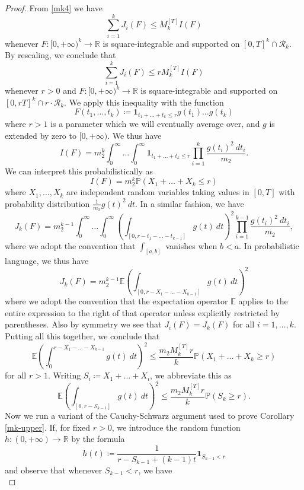 \documentclass{bmcart}
\theoremstyle{plain}
\theoremstyle{definition}
\newcommand\E{\mathbb{E}}
\newcommand\R{\mathbb{R}}
\renewcommand\P{\mathbb{P}}
\newcommand{\onef}{\mathbf{1}}
\begin{document}
\begin{proof}  From \eqref{mk4} we have
$$ \sum_{i=1}^k J_i(F) \leq M_k^{[T]} I(F)$$
whenever $F: [0,+\infty)^k \to \R$ is square-integrable and supported on $[0,T]^k \cap {\mathcal R}_k$.  By rescaling, we conclude that
$$ \sum_{i=1}^k J_i(F) \leq r M_k^{[T]} I(F)$$
whenever $r>0$ and $F: [0,+\infty)^k \to \R$ is square-integrable and supported on $[0,rT]^k \cap r \cdot {\mathcal R}_k$.  We apply this inequality with the function
$$ F(t_1,\dots,t_k) \coloneqq \onef_{t_1+\dots+t_k \leq r} g(t_1) \dots g(t_k)$$
where $r>1$ is a parameter which we will eventually average over, and $g$ is extended by zero to $[0,+\infty)$.  We thus have
$$ I(F) = m_2^k \int_0^\infty \dots \int_0^\infty \onef_{t_1+\dots+t_k \leq r} \prod_{i=1}^k \frac{g(t_i)^2\ dt_i}{m_2}.$$
We can interpret this probabilistically as
$$ I(F) = m_2^k \P( X_1 + \dots + X_k \leq r )$$
where $X_1,\dots,X_k$ are independent random variables taking values in $[0,T]$ with probability distribution $\frac{1}{m_2} g(t)^2\ dt$.  In a similar fashion, we have
$$ J_k(F) = m_2^{k-1} \int_0^\infty \dots \int_0^\infty\left (\int_{[0,r-t_1-\dots-t_{k-1}]} g(t)\ dt\right)^2 \prod_{i=1}^{k-1} \frac{g(t_i)^2\ dt_i}{m_2},$$
where we adopt the convention that $\int_{[a,b]}$ vanishes when $b<a$.  In probabilistic language, we thus have
$$ J_k(F) = m_2^{k-1} \E \left(\int_{[0,r-X_1-\dots-X_{k-1}]} g(t)\ dt\right)^2$$
where we adopt the convention that the expectation operator $\E$ applies to the entire expression to the right of that operator unless explicitly restricted by parentheses.
Also by symmetry we see that $J_i(F)=J_k(F)$ for all $i=1,\dots,k$.  Putting all this together, we conclude that
$$\E \left(\int_0^{r-X_1-\dots-X_{k-1}} g(t)\ dt\right)^2 \leq \frac{m_2 M_k^{[T]} r}{k} \P( X_1 + \dots + X_k \geq r )$$
for all $r>1$.  Writing $S_i \coloneqq X_1 + \dots + X_i$, we abbreviate this as
\begin{equation}\label{rg1}
\E \left(\int_{[0,r-S_{k-1}]} g(t)\ dt\right)^2 \leq \frac{m_2 M_k^{[T]} r}{k} \P( S_k \geq r ).
\end{equation}
Now we run a variant of the Cauchy-Schwarz argument used to prove Corollary \ref{mk-upper}.  If, for fixed $r>0$, we introduce the random function $h: (0,+\infty) \to \R$ by the formula
\begin{equation}\label{hdef}
 h(t) \coloneqq \frac{1}{r-S_{k-1}+(k-1)t} \onef_{S_{k-1} < r}
\end{equation}
and observe that whenever $S_{k-1} < r$, we have
\begin{equation}\label{h-int}

\end{equation}
\end{proof}
\end{document}
